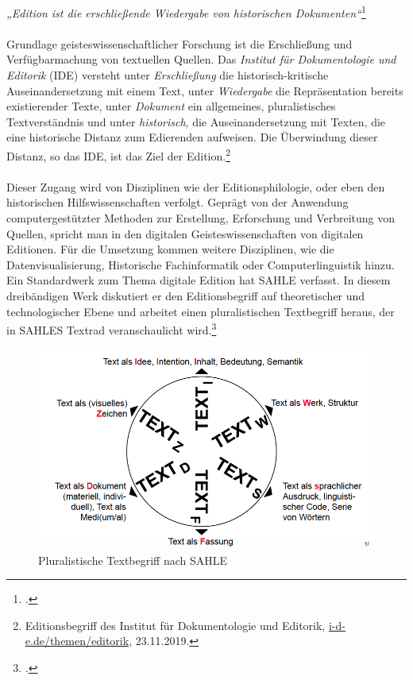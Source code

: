 \documentclass[12pt,a4paper]{article}
\begin{document}
\textit{„Edition ist die erschließende Wiedergabe von historischen Dokumenten“}\footcite[][S.76]{sahle2003edition}
\\
\\
Grundlage geisteswissenschaftlicher Forschung ist die Erschließung und Verfügbarmachung von textuellen Quellen. Das \textit{Institut für Dokumentologie und Editorik} (IDE) versteht unter \textit{Erschließung} die historisch-kritische Auseinandersetzung mit einem Text, unter \textit{Wiedergabe} die Repräsentation bereits existierender Texte, unter \textit{Dokument} ein allgemeines, pluralistisches Textverständnis und unter \textit{historisch}, die Auseinandersetzung mit Texten, die eine historische Distanz zum Edierenden aufweisen. Die Überwindung dieser Distanz, so das IDE, ist das Ziel der Edition.\footnote{Editionsbegriff des Institut für Dokumentologie und Editorik, \url{i-d-e.de/themen/editorik}, 23.11.2019.}
\\
\\
Dieser Zugang wird von Disziplinen wie der Editionsphilologie, oder eben den historischen Hilfswissenschaften verfolgt. Geprägt von der Anwendung computergestützter Methoden zur Erstellung, Erforschung und Verbreitung von Quellen, spricht man in den digitalen Geisteswissenschaften von digitalen Editionen. Für die Umsetzung kommen weitere Disziplinen, wie die Datenvisualisierung, Historische Fachinformatik oder Computerlinguistik hinzu. Ein Standardwerk zum Thema digitale Edition hat SAHLE verfasst. In diesem dreibändigen Werk diskutiert er den Editionsbegriff auf theoretischer und technologischer Ebene und arbeitet einen pluralistischen Textbegriff heraus, der in SAHLES Textrad veranschaulicht wird.\footcite[][]{sahle2013digitale}
\begin{figure}[H]
\centering
	\includegraphics[width=1\textwidth]{img/textrad.png}  
    \caption[Pluralistische Textbegriff als Rad, SAHLE: Digitale Editionsformen: Textbegriffe und Recodierung, S.45-49]{Pluralistische Textbegriff nach SAHLE} \label{fig:textrad}
\end{figure}
\end{document}
